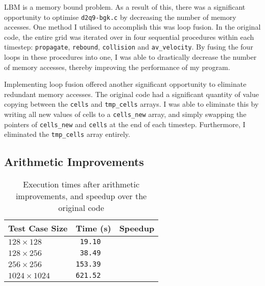 \documentclass[11pt, twocolumn, a4paper]{article}
\begin{document}
LBM is a memory bound problem.
As a result of this, there was a significant opportunity to optimise \texttt{d2q9-bgk.c} by decreasing the number of memory accesses.
One method I utilised to accomplish this was loop fusion.
In the original code, the entire grid was iterated over in four sequential procedures within each timestep: \texttt{propagate}, \texttt{rebound}, \texttt{collision} and \texttt{av\_velocity}.
By fusing the four loops in these procedures into one, I was able to drastically decrease the number of memory accesses, thereby improving the performance of my program.

Implementing loop fusion offered another significant opportunity to eliminate redundant memory accesses.
The original code had a significant quantity of value copying between the \texttt{cells} and \texttt{tmp\_cells} arrays.
I was able to eliminate this by writing all new values of cells to a \texttt{cells\_new} array, and simply swapping the pointers of \texttt{cells\_new} and \texttt{cells} at the end of each timestep.
Furthermore, I eliminated the \texttt{tmp\_cells} array entirely.

\subsection{Arithmetic Improvements}

\begin{table}[htbp]
  \begin{center}
  \caption{Execution times after arithmetic improvements, and speedup over the original code}\label{tab:arithmetic_improvements}
  \begin{tabular}{l | l l} 
      \hline\hline
      Test Case Size&Time (s)&Speedup\\
      \hline
      $128 \times 128$&\texttt{ 19.10}\\
      $128 \times 256$&\texttt{ 38.49}\\
      $256 \times 256$&\texttt{153.39}\\
      $1024 \times 1024$&\texttt{621.52}\\
      \hline
    \end{tabular}
  \end{center}
\end{table} 
\end{document}
